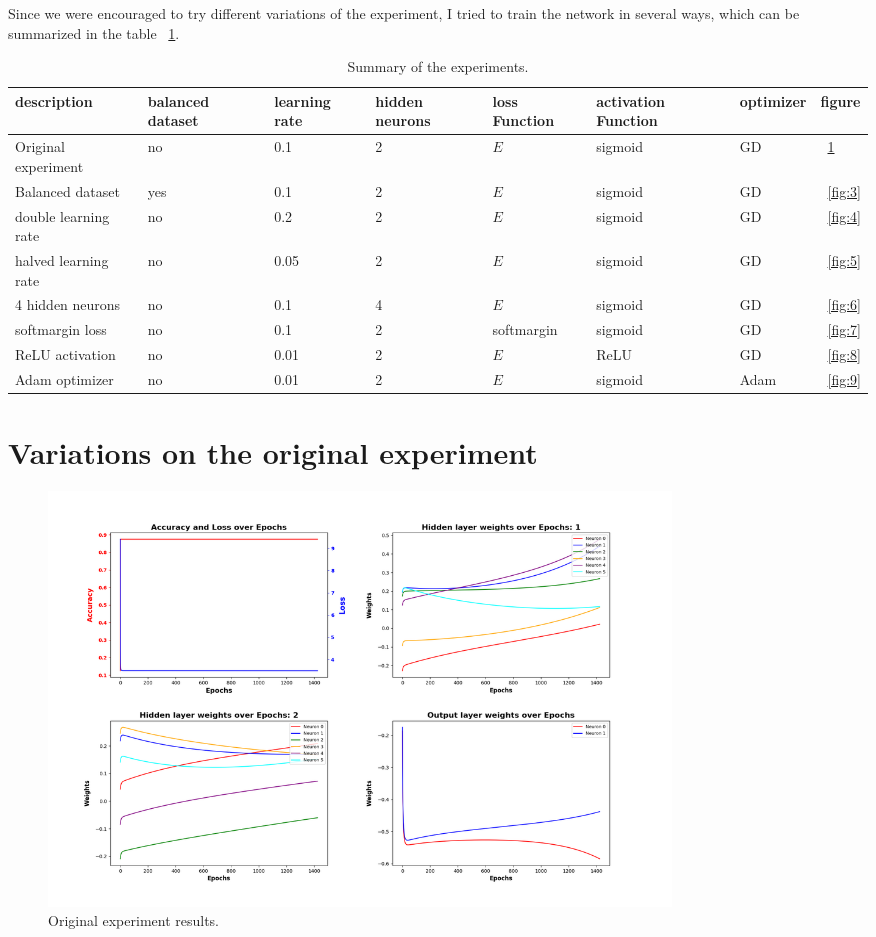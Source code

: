 \documentclass{article}
\begin{document}
    Since we were encouraged to try different variations of the experiment, I tried to train the network in several ways, which can be summarized in the table ~\ref{tab:1}.

    \begin{table}
        \footnotesize
        \centering
        \begin{tabular}{ p{2.6cm} p{1.5cm} p{1.5cm} p{1.5cm} p{1.5cm} p{1.5cm} p{1.5cm} p{1.5cm} }
            \hline
            \textbf{description} & \textbf{balanced dataset} & \textbf{learning rate} & \textbf{hidden neurons} & \textbf{loss Function} & \textbf{activation Function} & \textbf{optimizer} & \textbf{figure}\\
            \hline
            Original experiment & no & 0.1 & 2 & $E$ & sigmoid & GD & ~\ref{fig:2}\\
            Balanced dataset & yes & 0.1 & 2 & $E$ & sigmoid & GD & ~\ref{fig:3}\\
            double learning rate & no & 0.2 & 2 & $E$ & sigmoid & GD & ~\ref{fig:4}\\
            halved learning rate & no & 0.05 & 2 & $E$ & sigmoid & GD & ~\ref{fig:5}\\
            4 hidden neurons & no & 0.1 & 4 & $E$ & sigmoid & GD & ~\ref{fig:6}\\
            softmargin loss & no & 0.1 & 2 & softmargin & sigmoid & GD & ~\ref{fig:7}\\
            ReLU activation & no & 0.01 & 2 & $E$ & ReLU & GD & ~\ref{fig:8}\\
            Adam optimizer & no & 0.01 & 2 & $E$ & sigmoid & Adam & ~\ref{fig:9}\\
            \hline
        \end{tabular}
        \caption{Summary of the experiments.}
        \label{tab:1}
    \end{table}

    \newpage
    \section{Variations on the original experiment}\label{sec:variations}

    \begin{figure}
        \centering
        \includegraphics[width=0.8\textwidth]{images/plt-00}
        \caption{Original experiment results.}
        \label{fig:2}
    \end{figure}
\end{document}

